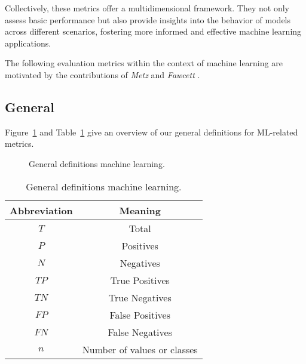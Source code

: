\documentclass{article}
\begin{document}
Collectively, these metrics offer a multidimensional framework. They not only assess basic performance but also provide insights into the behavior of models across different scenarios, fostering more informed and effective machine learning applications.


The following evaluation metrics within the context of machine learning are motivated by the contributions of \textit{Metz} \cite{metz1978basic} and \textit{Fawcett} \cite{fawcett2006introduction}.


\subsection{General}

Figure~\ref{figure:ML_general} and Table~\ref{table:ML_general} give an overview of our general definitions for ML-related metrics.

\begin{figure}[H]
	\centering


	\caption{General definitions machine learning.}
	\label{figure:ML_general}
\end{figure}

\begin{table}[H]
	\centering

	\begin{tabular}{|c|c|}
		\hline
		Abbreviation & Meaning \\
		\hline
		\hline
		$\textit{T}$  & Total                       \\
		$\textit{P}$  & Positives                   \\
		$\textit{N}$  & Negatives                   \\
		$\textit{TP}$ & True Positives              \\
		$\textit{TN}$ & True Negatives              \\
		$\textit{FP}$ & False Positives             \\
		$\textit{FN}$ & False Negatives             \\
		$n$           & Number of values or classes \\
		\hline
	\end{tabular}

	\caption{General definitions machine learning.}
	\label{table:ML_general}
\end{table}
\end{document}
